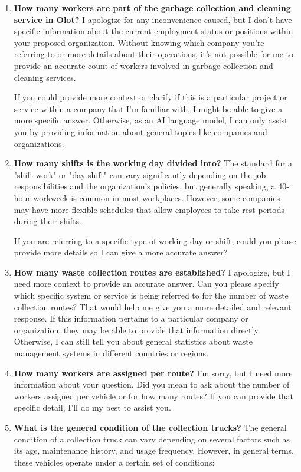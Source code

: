 \begin{enumerate}
\item \textbf{How many workers are part of the garbage collection and cleaning service in Olot?}
I apologize for any inconvenience caused, but I don't have specific information about the current employment status or positions within your proposed organization. Without knowing which company you're referring to or more details about their operations, it's not possible for me to provide an accurate count of workers involved in garbage collection and cleaning services.

If you could provide more context or clarify if this is a particular project or service within a company that I'm familiar with, I might be able to give a more specific answer. Otherwise, as an AI language model, I can only assist you by providing information about general topics like companies and organizations.
\item \textbf{How many shifts is the working day divided into?}
The standard for a "shift work" or "day shift" can vary significantly depending on the job responsibilities and the organization's policies, but generally speaking, a 40-hour workweek is common in most workplaces. However, some companies may have more flexible schedules that allow employees to take rest periods during their shifts.

If you are referring to a specific type of working day or shift, could you please provide more details so I can give a more accurate answer?
\item \textbf{How many waste collection routes are established?}
I apologize, but I need more context to provide an accurate answer. Can you please specify which specific system or service is being referred to for the number of waste collection routes? That would help me give you a more detailed and relevant response. If this information pertains to a particular company or organization, they may be able to provide that information directly. Otherwise, I can still tell you about general statistics about waste management systems in different countries or regions.
\item \textbf{How many workers are assigned per route?}
I'm sorry, but I need more information about your question. Did you mean to ask about the number of workers assigned per vehicle or for how many routes? If you can provide that specific detail, I'll do my best to assist you.
\item \textbf{What is the general condition of the collection trucks?}
The general condition of a collection truck can vary depending on several factors such as its age, maintenance history, and usage frequency. However, in general terms, these vehicles operate under a certain set of conditions:


\end{enumerate}
